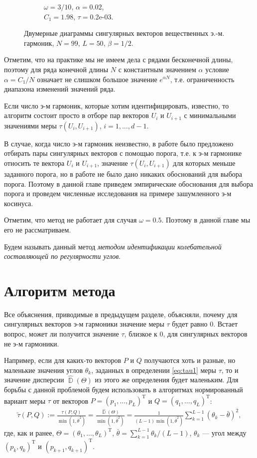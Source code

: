 \documentclass[specialist,
               substylefile = spbu.rtx,
               subf,href,colorlinks=true, 12pt]{disser}
\DeclareMathOperator{\D}{\mathbb{D}}
\begin{document}
\begin{figure}[h]
\begin{subfigure}[b]{0.3\textwidth}
       \caption{$\omega=3/10$, $\alpha = 0.02$,\\ $C_1 = 1.98$, $\tau =$0.2e-03.}
    \end{subfigure}
    \caption{Двумерные диаграммы сингулярных векторов вещественных э.-м. гармоник, $N=99$, $L=50$, $\beta=1/2$.}
    \label{fig:re_ex_mod_diagram}
\end{figure} 

Отметим, что на практике мы не имеем дела с рядами бесконечной длины, поэтому для ряда конечной длины $N$ с константным значением $\alpha$ условие $\alpha = C_1/N$ означает не слишком большое значение $e^{\alpha N}$, т.е. ограниченность диапазона изменений значений ряда.


Если число э-м гармоник, которые хотим идентифицировать, известно, то алгоритм состоит просто в отборе пар векторов $U_i$ и $U_{i+1}$ с минимальными значениями меры  $\tau(U_i, U_{i+1})$, $i=1,\ldots, d-1$.

В случае, когда число
э-м гармоник неизвестно, в работе \cite{Zhornikova2016} было предложено отбирать пары сингулярных векторов с
помощью порога, т.е. к э-м гармонике относить те вектора $U_i$ и $U_{i+1}$, значение  $\tau(U_i, U_{i+1})$ для которых меньше заданного порога, но в работе не было дано никаких обоснований для выбора порога. 
Поэтому в данной главе приведем эмпирические обоснования для выбора порога и проведем численные исследования на примере зашумленного э-м косинуса.    

Отметим, что метод не работает для случая $\omega = 0.5$. Поэтому в данной главе мы его не рассматриваем.

Будем называть данный метод \textit{методом идентификации колебательной составляющей по регулярности углов}.


\section{Алгоритм метода}
Все объяснения, приводимые в предыдущем разделе, объясняли, почему для сингулярных векторов э-м гармоники значение меры $\tau$ будет равно 0. Встает вопрос, может ли получится значение $\tau$, близкое к 0, для сингулярных векторов не э-м гармоники. 

Например, если для каких-то векторов $P$ и $Q$ получаются хоть и разные, но маленькие значения углов $\theta_k$, заданных в определении \eqref{eq:tau1} меры $\tau$, то и значение дисперсии $\hat{\D}(\Theta)$ из этого же определения будет маленьким. 
Для борьбы с данной проблемой будем использовать в алгоритмах нормированный вариант меры $\tau$ от векторов $P = (p_1,\ldots,p_L)^{\mathrm{T}}$ и $Q=(q_1,\ldots,q_L)^{\mathrm{T}}$:
\begin{gather} \label{eq:tau_norm}
\tilde{\tau}(P, Q) := \frac{\tau(P, Q)}{\min(1, \bar{\theta}^2)} =\frac{\hat{\D}(\Theta)}{\min(1, \bar{\theta}^2)} =\frac{1}{(L-1) \min(1, \bar{\theta}^2)}\sum_{k=1}^{L-1}{\left(\theta_k  - \bar{\theta}\right)^2},
\end{gather} 
где, как и ранее, $\Theta=(\theta_1,\ldots,\theta_L)^{\mathrm{T}}$,
$\bar{\theta} = \sum_{k=1}^{L-1}{\theta_k}/(L-1)$, $\theta_k$ --- угол между  
$\left(p_k, q_{k}\right)^{\mathrm{T}}$ и $\left(p_{k+1}, q_{k+1}\right)^{\mathrm{T}}$.
\end{document}
